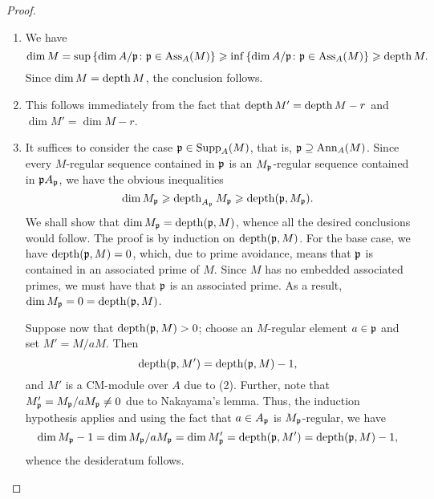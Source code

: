 \begin{proof}
\begin{enumerate}[label=(\arabic*)]
    \item We have 
    \begin{equation*}
        \dim M = \sup\left\{\dim A/\mathfrak{p}\colon \mathfrak{p}\in\operatorname{Ass}_A(M)\right\}\geqslant\inf\left\{\dim A/\mathfrak{p}\colon\mathfrak{p}\in\operatorname{Ass}_A(M)\right\}\geqslant\operatorname{depth} M.
    \end{equation*}
    Since $\dim M = \operatorname{depth} M$, the conclusion follows.
    \item This follows immediately from the fact that $\operatorname{depth} M' = \operatorname{depth} M - r$ and $\dim M' = \dim M - r$.
    \item It suffices to consider the case $\mathfrak{p}\in\operatorname{Supp}_A(M)$, that is, $\mathfrak{p}\supseteq\operatorname{Ann}_A(M)$. Since every $M$-regular sequence contained in $\mathfrak{p}$ is an $M_{\mathfrak{p}}$-regular sequence contained in $\mathfrak{p} A_{\mathfrak{p}}$, we have the obvious inequalities 
    \begin{equation*}
        \dim M_{\mathfrak{p}}\geqslant\operatorname{depth}_{A_{\mathfrak{p}}} M_{\mathfrak{p}}\geqslant\operatorname{depth}(\mathfrak{p}, M_{\mathfrak{p}}).
    \end{equation*}
    We shall show that $\dim M_{\mathfrak{p}} = \operatorname{depth}(\mathfrak{p}, M)$, whence all the desired conclusions would follow. The proof is by induction on $\operatorname{depth}(\mathfrak{p}, M)$. For the base case, we have $\operatorname{depth}(\mathfrak{p}, M) = 0$, which, due to prime avoidance, means that $\mathfrak{p}$ is contained in an associated prime of $M$. Since $M$ has no embedded associated primes, we must have that $\mathfrak{p}$ is an associated prime. As a result, $\dim M_{\mathfrak{p}} = 0 = \operatorname{depth}(\mathfrak{p}, M)$.

    Suppose now that $\operatorname{depth}(\mathfrak{p}, M) > 0$; choose an $M$-regular element $a\in\mathfrak{p}$ and set $M'= M/aM$. Then 
    \begin{equation*}
        \operatorname{depth}(\mathfrak{p}, M') = \operatorname{depth}(\mathfrak{p}, M) - 1,
    \end{equation*}
    and $M'$ is a CM-module over $A$ due to (2). Further, note that $M'_{\mathfrak{p}} = M_{\mathfrak{p}}/a M_{\mathfrak{p}}\ne 0$ due to Nakayama's lemma. Thus, the induction hypothesis applies and using the fact that $a\in A_{\mathfrak{p}}$ is $M_{\mathfrak{p}}$-regular, we have 
    \begin{equation*}
        \dim M_{\mathfrak{p}} - 1 = \dim M_{\mathfrak{p}}/a M_{\mathfrak{p}} = \dim M'_{\mathfrak{p}} = \operatorname{depth}(\mathfrak{p}, M') = \operatorname{depth}(\mathfrak{p}, M) - 1,
    \end{equation*}
    whence the desideratum follows. \qedhere
\end{enumerate}
\end{proof}

